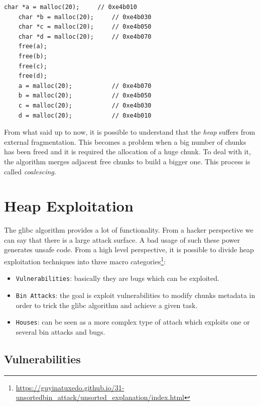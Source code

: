 \documentclass{article}
\numberwithin{equation}{subsection}
\begin{document}
\begin{minipage}{\textwidth}
\centering
    \lstset{style=cstyle}
    \begin{lstlisting}[caption={Fast chunk allocation and de-allocation.},captionpos=b,label={lst:fast-chunk}]
    char *a = malloc(20);     // 0xe4b010
    char *b = malloc(20);     // 0xe4b030
    char *c = malloc(20);     // 0xe4b050
    char *d = malloc(20);     // 0xe4b070
    free(a);
    free(b);
    free(c);
    free(d);
    a = malloc(20);           // 0xe4b070
    b = malloc(20);           // 0xe4b050
    c = malloc(20);           // 0xe4b030
    d = malloc(20);           // 0xe4b010
\end{lstlisting}
\end{minipage}
\noindent
From what said up to now, it is possible to understand that the \emph{heap} suffers from external fragmentation. This becomes a problem when a big number of chunks has been freed and it is required the allocation of a huge chunk. To deal with it, the algorithm merges adjacent free chunks to build a bigger one. This process is called \emph{coalescing}.

\section{Heap Exploitation}
The glibc algorithm provides a lot of functionality. From a hacker perspective we can say that there is a large attack surface. A bad usage of such these power generates unsafe code. From a high level perspective, it is possible to divide heap exploitation techniques into three macro categories\footnote{\href{https://guyinatuxedo.github.io/31-unsortedbin_attack/unsorted_explanation/index.html}{https://guyinatuxedo.github.io/31-unsortedbin\_attack/unsorted\_explanation/index.html}}:
\begin{itemize}
    \item \texttt{Vulnerabilities}: basically they are bugs which can be exploited.
    \item \texttt{Bin Attacks}: the goal is exploit vulnerabilities to modify chunks metadata in order to trick the glibc algorithm and achieve a given task.
    \item \texttt{Houses}: can be seen as a more complex type of attach which exploits one or several bin attacks and bugs.
\end{itemize}
\clearpage
\subsection{Vulnerabilities}
\end{document}
